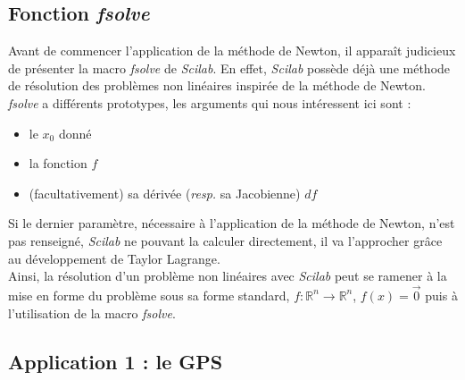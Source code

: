 \documentclass[a4paper,10pt]{report}
\begin{document}
\subsection{Fonction \textit{fsolve}}
Avant de commencer l'application de la méthode de Newton, il apparaît judicieux de présenter la macro \textit{fsolve} de \textit{Scilab}. En effet, \textit{Scilab} possède déjà une méthode de résolution des problèmes non linéaires inspirée de la méthode de Newton. \textit{fsolve} a différents prototypes, les arguments qui nous intéressent ici sont :
\begin{itemize}
\item le $x_0$ donné
\item la fonction $f$
\item (facultativement) sa dérivée (\textit{resp.} sa Jacobienne) $df$
\end{itemize}
Si le dernier paramètre, nécessaire à l'application de la méthode de Newton, n'est pas renseigné, \textit{Scilab} ne pouvant la calculer directement, il va l'approcher grâce au développement de Taylor Lagrange.\\
\indent Ainsi, la résolution d'un problème non linéaires avec \textit{Scilab} peut se ramener à la mise en forme du problème sous sa forme standard, $f : \mathbb{R}^n \longrightarrow \mathbb{R}^n$, $f(x)=\overrightarrow{0}$ puis à l'utilisation de la macro \textit{fsolve}.

\subsection{Application 1 : le GPS}
\end{document}
